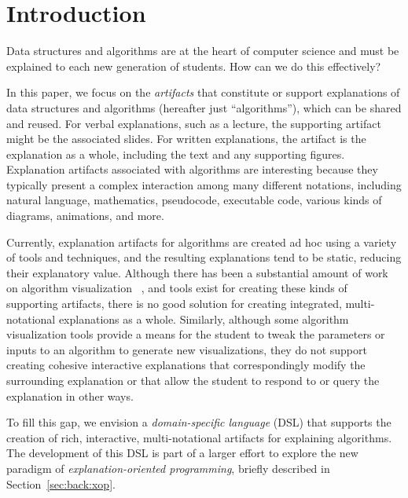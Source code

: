 \documentclass[conference]{IEEEtran}
\begin{document}
\section{Introduction}
\label{sec:intro}

Data structures and algorithms are at the heart of computer science and must be
explained to each new generation of students. How can we do this effectively?


In this paper, we focus on the \emph{artifacts} that constitute or support
explanations of data structures and algorithms (hereafter just ``algorithms''),
which can be shared and reused.
%
For verbal explanations, such as a lecture, the supporting artifact might be
the associated slides. For written explanations, the artifact is the
explanation as a whole, including the text and any supporting figures.
%
Explanation artifacts associated with algorithms are interesting because they
typically present a complex interaction among many different notations,
including natural language, mathematics, pseudocode, executable code, various
kinds of diagrams, animations, and more.


Currently, explanation artifacts for algorithms are created ad hoc using a
variety of tools and techniques, and the resulting explanations tend to be
static, reducing their explanatory value.
%
Although there has been a substantial amount of work on algorithm
visualization~\cite{Gloor92,Gloor97,HDS02, shaffer2010algorithm, HANSEN2002291,
  KANN1997223}  , and tools exist for
creating these kinds of supporting artifacts, there is no good solution for
creating integrated, multi-notational explanations as a whole. Similarly,
although some algorithm visualization tools provide a means for the student to
tweak the parameters or inputs to an algorithm to generate new visualizations,
they do not support creating cohesive interactive explanations that
correspondingly modify the surrounding explanation or that allow the student to
respond to or query the explanation in other ways.


To fill this gap, we envision a \emph{domain-specific language} (DSL) that
supports the creation of rich, interactive, multi-notational artifacts for
explaining algorithms.
%
The development of this DSL is part of a larger effort to explore the new
paradigm of \emph{explanation-oriented programming}, briefly described in
Section~\ref{sec:back:xop}.
\end{document}
